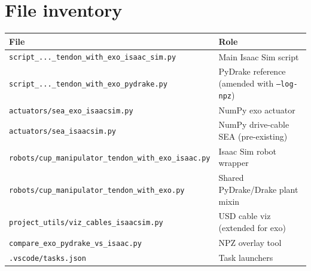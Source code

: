 \documentclass[11pt,a4paper]{article}
\begin{document}
\section{File inventory}

\begin{table}[H]
\centering
\small
\begin{tabular}{@{}ll@{}}
\toprule
\textbf{File} & \textbf{Role} \\
\midrule
\texttt{script\_...\_tendon\_with\_exo\_isaac\_sim.py} & Main Isaac Sim script \\
\texttt{script\_...\_tendon\_with\_exo\_pydrake.py} & PyDrake reference (amended with \texttt{--log-npz}) \\
\texttt{actuators/sea\_exo\_isaacsim.py} & NumPy exo actuator \\
\texttt{actuators/sea\_isaacsim.py} & NumPy drive-cable SEA (pre-existing) \\
\texttt{robots/cup\_manipulator\_tendon\_with\_exo\_isaac.py} & Isaac Sim robot wrapper \\
\texttt{robots/cup\_manipulator\_tendon\_with\_exo.py} & Shared PyDrake/Drake plant mixin \\
\texttt{project\_utils/viz\_cables\_isaacsim.py} & USD cable viz (extended for exo) \\
\texttt{compare\_exo\_pydrake\_vs\_isaac.py} & NPZ overlay tool \\
\texttt{.vscode/tasks.json} & Task launchers \\
\bottomrule
\end{tabular}
\end{table}
\end{document}
